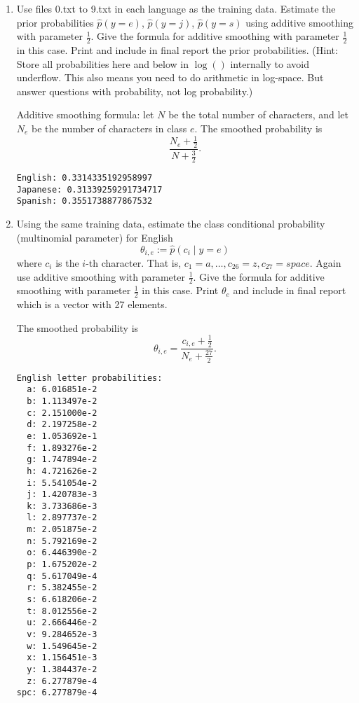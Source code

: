 \documentclass[a4paper]{article}
\theoremstyle{definition}
\newenvironment{soln}{
    \leavevmode\color{blue}\ignorespaces
}{}
\begin{document}
\begin{enumerate}
\item
Use files 0.txt to 9.txt in each language as the training data.
Estimate the prior probabilities 
$\hat p(y=e)$,
$\hat p(y=j)$,
$\hat p(y=s)$
using additive smoothing with parameter $\frac{1}{2}$. 
Give the formula for additive smoothing with parameter $\frac{1}{2}$ in this case. 
Print and include in final report the prior probabilities.
(Hint: Store all probabilities here and below in $\log()$ internally to avoid underflow. This also means you need to do arithmetic in log-space.  But answer questions with probability, not log probability.)

\begin{soln}
    Additive smoothing formula: let $N$ be the total number of characters, and let $N_e$ be the number of characters in class $e$. The smoothed probability is
    \[ \frac{N_e+\frac{1}{2}}{N+\frac{3}{2}}. \]

\begin{verbatim}
English: 0.3314335192958997
Japanese: 0.31339259291734717
Spanish: 0.3551738877867532
\end{verbatim}
\end{soln}

\item
Using the same training data, estimate the class conditional probability (multinomial parameter) for English
$$\theta_{i,e} := \hat p(c_i \mid y=e)$$ 
where $c_i$ is the $i$-th character. That is, $c_1 = a, \ldots, c_{26} = z, c_{27} = space$.
Again use additive smoothing with parameter $\frac{1}{2}$.
Give the formula for additive smoothing with parameter $\frac{1}{2}$ in this case. 
Print $\theta_e$ and include in final report which is a vector with 27 elements.

\begin{soln}
   The smoothed probability is
    \[ \theta_{i,e}=\frac{c_{i,e}+\frac{1}{2}}{N_e+\frac{27}{2}}. \]
    

\begin{verbatim}
English letter probabilities:
  a: 6.016851e-2
  b: 1.113497e-2
  c: 2.151000e-2
  d: 2.197258e-2
  e: 1.053692e-1
  f: 1.893276e-2
  g: 1.747894e-2
  h: 4.721626e-2
  i: 5.541054e-2
  j: 1.420783e-3
  k: 3.733686e-3
  l: 2.897737e-2
  m: 2.051875e-2
  n: 5.792169e-2
  o: 6.446390e-2
  p: 1.675202e-2
  q: 5.617049e-4
  r: 5.382455e-2
  s: 6.618206e-2
  t: 8.012556e-2
  u: 2.666446e-2
  v: 9.284652e-3
  w: 1.549645e-2
  x: 1.156451e-3
  y: 1.384437e-2
  z: 6.277879e-4
spc: 6.277879e-4
\end{verbatim}
\end{soln}


\end{enumerate}
\end{document}
